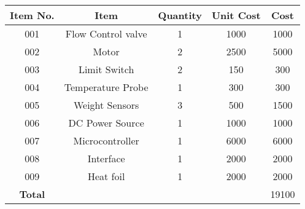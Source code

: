 \begin{table}[ht]
  \begin{center}
    \leavevmode
     \begin{tabular}{|c | c | c | c | c |}\hline
      \textbf{Item No.} &  \textbf{Item} & \textbf{Quantity} & \textbf{Unit Cost} & \textbf{Cost} \\
     \hline
     001 & Flow Control valve & 1 & 1000 &  1000 \\
     \hline
     002 & Motor & 2 & 2500 &  5000 \\
     \hline
     003 & Limit Switch & 2 & 150 &  300 \\
     \hline
     004 & Temperature Probe & 1 & 300 &  300 \\
     \hline
     005 & Weight Sensors & 3 & 500 & 1500 \\
     \hline
     006 & DC Power Source & 1 & 1000 &  1000 \\
     \hline
     007 & Microcontroller &  1 & 6000 & 6000 \\
     \hline
     008 & Interface  & 1 & 2000  & 2000 \\
     \hline
     009 & Heat foil & 1 & 2000 & 2000 \\
     \hline
     \textbf{Total} & & & & 19100 \\
     \hline
    \end{tabular}
    \label{table:1}
  \end{center}
\end{table}



    